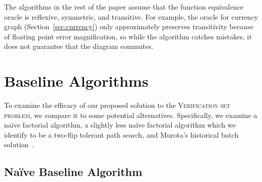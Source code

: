\documentclass[sigplan,review,anonymous]{acmart}
\begin{document}
The algorithms in the rest of the paper assume that the function equivalence oracle is reflexive, symmetric, and transitive.
For example, the oracle for currency graph (Section~\ref{sec:currency}) only approximately preserves transitivity because of floating point error magnification, so while the algorithm catches mistakes, it does not guarantee that the diagram commutes.

\section{Baseline Algorithms}

To examine the efficacy of our proposed solution to the \textsc{Verification set problem}, we compare it to some potential alternatives.
Specifically, we examine a na\"{i}ve factorial algorithm, a slightly less na\"{i}ve factorial algorithm which we identify to be a two-flip tolerant path search, and Murota's historical batch solution~\cite{commutative}.

\subsection{Na\"{i}ve Baseline Algorithm}

\end{document}
